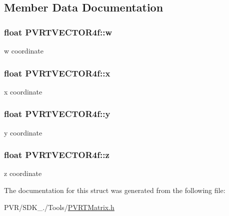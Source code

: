 \subsection{Member Data Documentation}
\hypertarget{struct_p_v_r_t_v_e_c_t_o_r4f_aaeda004b84816254d27d893acbdcad9c}{
\subsubsection[{w}]{\setlength{\rightskip}{0pt plus 5cm}float P\+V\+R\+T\+V\+E\+C\+T\+O\+R4f\+::w}}\label{struct_p_v_r_t_v_e_c_t_o_r4f_aaeda004b84816254d27d893acbdcad9c}
w coordinate \hypertarget{struct_p_v_r_t_v_e_c_t_o_r4f_ac992f76e6db0441d0d34342849642ef2}{
\subsubsection[{x}]{\setlength{\rightskip}{0pt plus 5cm}float P\+V\+R\+T\+V\+E\+C\+T\+O\+R4f\+::x}}\label{struct_p_v_r_t_v_e_c_t_o_r4f_ac992f76e6db0441d0d34342849642ef2}
x coordinate \hypertarget{struct_p_v_r_t_v_e_c_t_o_r4f_a40b8f5d5ce0d67a4e5a304903b0624c6}{
\subsubsection[{y}]{\setlength{\rightskip}{0pt plus 5cm}float P\+V\+R\+T\+V\+E\+C\+T\+O\+R4f\+::y}}\label{struct_p_v_r_t_v_e_c_t_o_r4f_a40b8f5d5ce0d67a4e5a304903b0624c6}
y coordinate \hypertarget{struct_p_v_r_t_v_e_c_t_o_r4f_a18e646979526d221cdc53203e9fdd4e4}{
\subsubsection[{z}]{\setlength{\rightskip}{0pt plus 5cm}float P\+V\+R\+T\+V\+E\+C\+T\+O\+R4f\+::z}}\label{struct_p_v_r_t_v_e_c_t_o_r4f_a18e646979526d221cdc53203e9fdd4e4}
z coordinate 

The documentation for this struct was generated from the following file\+:\begin{DoxyCompactItemize}
\item 
P\+V\+R/\+S\+D\+K\+\_./\+Tools/\hyperlink{_p_v_r_t_matrix_8h}{P\+V\+R\+T\+Matrix.\+h}\end{DoxyCompactItemize}
